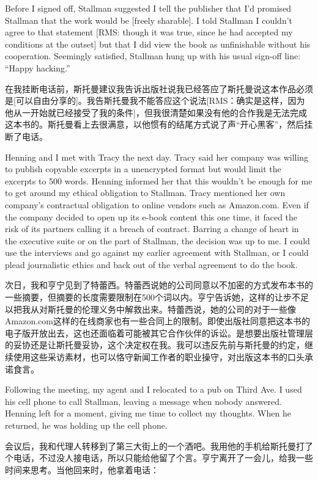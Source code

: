 \ifdefined\eng
Before I signed off, Stallman suggested I tell the publisher that I'd promised Stallman that the work would be [freely sharable]. I told Stallman I couldn't agree to that statement [RMS: though it was true, since he had accepted my conditions at the outset] but that I did view the book as unfinishable without his cooperation. Seemingly satisfied, Stallman hung up with his usual sign-off line: ``Happy hacking.''
\fi

\ifdefined\chs
在我挂断电话前，斯托曼建议我告诉出版社说我已经答应了斯托曼说这本作品必须是[可以自由分享的]。我告斯托曼我不能答应这个说法[RMS：确实是这样，因为他从一开始就已经接受了我的条件]，但我很清楚如果没有他的合作我是无法完成这本书的。斯托曼看上去很满意，以他惯有的结尾方式说了声“开心黑客”，然后挂断了电话。
\fi

\ifdefined\eng
Henning and I met with Tracy the next day. Tracy said her company was willing to publish copyable excerpts in a unencrypted format but would limit the excerpts to 500 words. Henning informed her that this wouldn't be enough for me to get around my ethical obligation to Stallman. Tracy mentioned her own company's contractual obligation to online vendors such as Amazon.com. Even if the company decided to open up its e-book content this one time, it faced the risk of its partners calling it a breach of contract. Barring a change of heart in the executive suite or on the part of Stallman, the decision was up to me. I could use the interviews and go against my earlier agreement with Stallman, or I could plead journalistic ethics and back out of the verbal agreement to do the book.
\fi

\ifdefined\chs
次日，我和亨宁见到了特蕾西。特蕾西说她的公司同意以不加密的方式发布本书的一些摘要，但摘要的长度需要限制在500个词以内。亨宁告诉她，这样的让步不足以把我从对斯托曼的伦理义务中解救出来。特蕾西说，她的公司的对于一些像Amazon.com这样的在线商家也有一些合同上的限制。即使出版社同意把这本书的电子版开放出去，这也还面临着可能被其它合作伙伴的诉讼。是想要出版社管理层的妥协还是让斯托曼妥协，这个决定权在我。我可以违反先前与斯托曼的约定，继续使用这些采访素材，也可以恪守新闻工作者的职业操守，对出版这本书的口头承诺食言。
\fi

\ifdefined\eng
Following the meeting, my agent and I relocated to a pub on Third Ave. I used his cell phone to call Stallman, leaving a message when nobody answered. Henning left for a moment, giving me time to collect my thoughts. When he returned, he was holding up the cell phone.
\fi

\ifdefined\chs
会议后，我和代理人转移到了第三大街上的一个酒吧。我用他的手机给斯托曼打了个电话，不过没人接电话，所以只能给他留了个言。亨宁离开了一会儿，给我一些时间来思考。当他回来时，他拿着电话：
\fi

